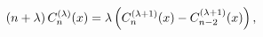 \[(n+\lambda)\mathop{C^{(\lambda)}_{n}\/}\nolimits\!\left(x\right)=\lambda\left(%
\mathop{C^{(\lambda+1)}_{n}\/}\nolimits\!\left(x\right)-\mathop{C^{(\lambda+1)%
}_{n-2}\/}\nolimits\!\left(x\right)\right),\]